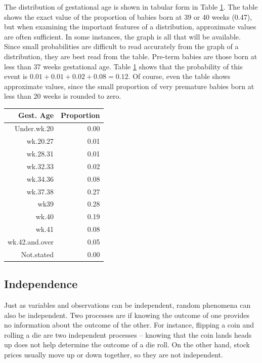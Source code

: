 The distribution of gestational age is shown in tabular form in Table \ref{gestageMarginalDistTable}.  The table shows the exact value of the proportion of babies born at 39 or 40 weeks (0.47), but when examining the important features of a distribution, approximate values are often sufficient.  In some instances, the graph is all that will be available.  Since small probabilities are difficult to read accurately from the graph of a distribution, they are best read from the table.  Pre-term babies are those born at less than 37 weeks gestational age.  Table \ref{gestageMarginalDistTable} shows that the probability of this event is $0.01 + 0.01 + 0.02 + 0.08 = 0.12$.  Of course, even the table shows approximate values, since the small proportion of very premature babies born at less than 20 weeks is rounded to zero.


\begin{table}[ht]
\label{gestageMarginalDistTable}
\centering
\begin{tabular}{rr}
  \hline
Gest. Age & Proportion \\ 
  \hline
Under.wk.20 & 0.00 \\ 
  wk.20.27 & 0.01 \\ 
  wk.28.31 & 0.01 \\ 
  wk.32.33 & 0.02 \\ 
  wk.34.36 & 0.08 \\ 
  wk.37.38 & 0.27 \\ 
  wk39 & 0.28 \\ 
  wk.40 & 0.19 \\ 
  wk.41 & 0.08 \\ 
  wk.42.and.over & 0.05 \\ 
  Not.stated & 0.00 \\ 
   \hline
\end{tabular}
\end{table}




\subsection{Independence}
\label{probabilityIndependence}

Just as variables and observations can be independent, random phenomena can also be independent. Two processes are  if knowing the outcome of one provides no information about the outcome of the other. For instance, flipping a coin and rolling a die are two independent processes -- knowing that the coin lands heads up does not help determine the outcome of a die roll. On the other hand, stock prices usually move up or down together, so they are not independent. 

